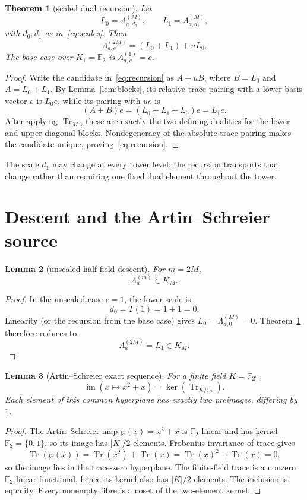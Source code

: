 \documentclass[11pt]{article}
\newtheorem{theorem}{Theorem}[section]
\newtheorem{lemma}[theorem]{Lemma}
\theoremstyle{remark}
\newcommand{\F}{\mathbb F}
\newcommand{\Tr}{\operatorname{Tr}}
\newcommand{\AS}{\wp}
\newcommand{\Lam}{\Lambda}
\begin{document}
\begin{theorem}[scaled dual recursion]\label{thm:recursion}
Let
\[
 L_0=\Lam^{(M)}_{a,d_0},\qquad
 L_1=\Lam^{(M)}_{a,d_1},
\]
with $d_0,d_1$ as in~\eqref{eq:scales}.  Then
\begin{equation}\label{eq:recursion}
 \boxed{\quad
 \Lam^{(2M)}_{a,c}=(L_0+L_1)+uL_0.
 \quad}
\end{equation}
The base case over $K_1=\F_2$ is $\Lam^{(1)}_{a,c}=c$.
\end{theorem}

\begin{proof}
Write the candidate in~\eqref{eq:recursion} as $A+uB$, where
$B=L_0$ and $A=L_0+L_1$.  By Lemma~\ref{lem:blocks}, its relative
trace pairing with a lower basis vector $e$ is $L_0e$, while its pairing
with $ue$ is
\[
 (A+B)e=(L_0+L_1+L_0)e=L_1e.
\]
After applying $\Tr_M$, these are exactly the two defining dualities for
the lower and upper diagonal blocks.  Nondegeneracy of the absolute trace
pairing makes the candidate unique, proving~\eqref{eq:recursion}.
\end{proof}

The scale $d_1$ may change at every tower level; the recursion transports that
change rather than requiring one fixed dual element throughout the tower.

\section{Descent and the Artin--Schreier source}

\begin{lemma}[unscaled half-field descent]\label{lem:descent}
For $m=2M$,
\[
 \Lam^{(m)}_a\in K_M.
\]
\end{lemma}

\begin{proof}
In the unscaled case $c=1$, the lower scale is
\[
 d_0=T(1)=1+1=0.
\]
Linearity (or the recursion from the base case) gives
$L_0=\Lam^{(M)}_{a,0}=0$.  Theorem~\ref{thm:recursion} therefore reduces to
\[
 \Lam^{(2M)}_a=L_1\in K_M.
\]
\end{proof}

\begin{lemma}[Artin--Schreier exact sequence]\label{lem:as}
For a finite field $K=\F_{2^m}$,
\[
 \operatorname{im}(x\mapsto x^2+x)=\ker(\Tr_{K/\F_2}).
\]
Each element of this common hyperplane has exactly two preimages, differing
by $1$.
\end{lemma}

\begin{proof}
The Artin--Schreier map $\AS(x)=x^2+x$ is $\F_2$-linear and has kernel
$\F_2=\{0,1\}$, so its image has $|K|/2$ elements.  Frobenius invariance of
trace gives
\[
 \Tr(\AS(x))=\Tr(x^2)+\Tr(x)=\Tr(x)^2+\Tr(x)=0,
\]
so the image lies in the trace-zero hyperplane.  The finite-field trace is a
nonzero $\F_2$-linear functional, hence its kernel also has $|K|/2$ elements.
The inclusion is equality.  Every nonempty fibre is a coset of the two-element
kernel.
\end{proof}
\end{document}
